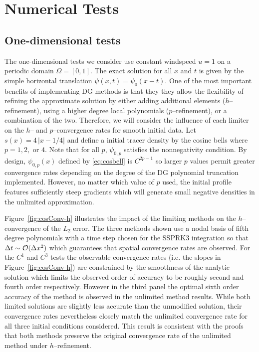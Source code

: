 \documentclass{ametsoc}
\begin{document}
\section{Numerical Tests} \label{sec:numTest}
\subsection*{One-dimensional tests}
The one-dimensional tests we consider use constant windspeed $u=1$ on a periodic domain $\Omega = [0,1]$. The exact solution for all $x$ and $t$ is given by the simple horizontal translation $\psi(x,t) = \psi_0(x-t)$. One of the most important benefits of implementing DG methods is that they they allow the flexibility of refining the approximate solution by either adding additional elements ($h$--refinement), using a higher degree local polynomials ($p$--refinement), or a combination of the two. Therefore, we will consider the influence of each limiter on the $h$-- and $p$--convergence rates for smooth initial data. Let $s(x) = 4 \, |x-1/4|$ and define a  initial tracer density by the cosine bells
where  $p=1,2,$ or $4$. Note that for all $p$, $\psi_{0,p}$ satisfies the nonnegativity condition. By design, $\psi_{0,p}(x)$ defined by \eqref{eq:cosbell} is $C^{2p-1}$ so larger $p$ values permit greater convergence rates depending on the degree of the DG polynomial truncation implemented. However, no matter which value of $p$ used, the initial profile features sufficiently steep gradients which will generate small negative densities in the unlimited approximation.

Figure~\ref{fig:cosConv-h} illustrates the impact of the limiting methods on the $h$--convergence of the $L_2$ error. The three methods shown use a nodal basis of fifth degree polynomials with a time step chosen for the SSPRK3 integration so that $\Delta t \sim \mathcal{O} ( \Delta x^{2} )$ which guarantees that spatial convergence rates are observed. For the $C^1$ and $C^3$ tests the observable convergence rates (i.e. the slopes in Figure~\ref{fig:cosConv-h}) are constrained by the smoothness of the analytic solution which limits the observed order of accuracy to be roughly second and fourth order respectively. However in the third panel the optimal sixth order accuracy of the method is observed in the unlimited method results. While both limited solutions are slightly less accurate than the unmodified solution, their convergence rates nevertheless closely match the unlimited convergence rate for all three initial conditions considered. This result is consistent with the proofs that both methods preserve the original convergence rate of the unlimited method under $h$--refinement. 
\end{document}
